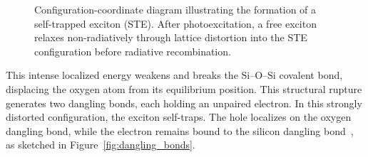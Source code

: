 \begin{figure}[ht]
\caption{Configuration-coordinate diagram illustrating the formation of a self-trapped exciton (STE). After photoexcitation, a free exciton relaxes non-radiatively through lattice distortion into the STE configuration before radiative recombination.}
\label{fig:STE}
\end{figure}


This intense localized energy weakens and breaks the $\text{Si--O--Si}$ covalent bond, displacing the oxygen atom from its equilibrium position. This structural rupture generates two dangling bonds, each holding an unpaired electron. In this strongly distorted configuration, the exciton self-traps. The hole localizes on the oxygen dangling bond, while the electron remains bound to the silicon dangling bond~\cite{mao2004}, as sketched in Figure~\ref{fig:dangling_bonds}.

